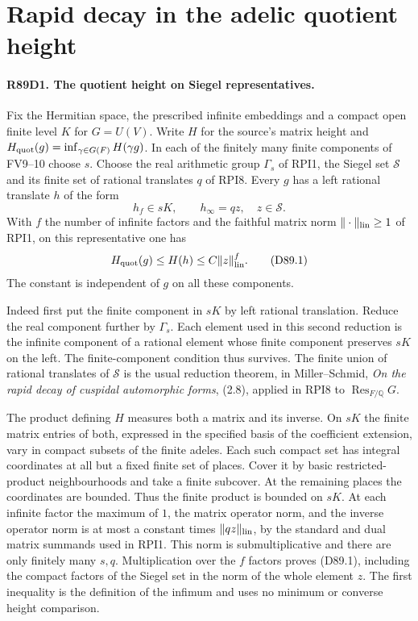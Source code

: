 \section{Rapid decay in the adelic quotient height}

\paragraph{R89D1. The quotient height on Siegel representatives.}
Fix the Hermitian space, the prescribed infinite embeddings and a
compact open finite level $K$ for $G=U(V)$. Write $H$ for the source's
matrix height and $H_{\rm quot}(g)=\inf_{\gamma\in G(F)}H(\gamma g)$.
In each of the finitely many finite components of FV9--10 choose $s$.
Choose the real arithmetic group $\Gamma_s$ of RPI1, the Siegel set
$\mathcal S$ and its finite set of rational translates $q$ of RPI8.
Every $g$ has a left rational translate $h$ of the form
\[
               h_f\in sK,\qquad h_\infty=qz,\quad z\in\mathcal S.
\]
With $f$ the number of infinite factors and the faithful matrix norm
$\|\cdot\|_{\rm lin}\ge1$ of RPI1, on this representative one has
\[
             H_{\rm quot}(g)\le H(h)\le C\|z\|_{\rm lin}^{f}.
                                                               \tag{D89.1}
\]
The constant is independent of $g$ on all these components.

Indeed first put the finite component in $sK$ by left rational
translation. Reduce the real component further by $\Gamma_s$.
Each element used in this second reduction is the infinite component
of a rational element whose finite component preserves $sK$ on the
left. The finite-component condition thus survives. The finite union
of rational translates of $\mathcal S$ is the usual reduction theorem,
in Miller--Schmid, \emph{On the rapid decay of cuspidal automorphic
forms}, (2.8), applied in RPI8 to $\operatorname{Res}_{F/\mathbb Q}G$.

The product defining $H$ measures both a matrix and its inverse. On
$sK$ the finite matrix entries of both, expressed in the specified
basis of the coefficient extension, vary in compact subsets of the
finite adeles. Each such compact set has integral coordinates at all
but a fixed finite set of places. Cover it by basic restricted-product
neighbourhoods and take a finite subcover. At the remaining places
the coordinates are bounded. Thus the finite product is bounded on
$sK$. At each infinite factor the maximum of $1$, the matrix
operator norm, and the inverse operator norm is at most a constant
times $\|qz\|_{\rm lin}$, by the standard and dual matrix
summands used in RPI1. This norm is submultiplicative and there are
only finitely many $s,q$. Multiplication over the $f$ factors proves
(D89.1), including the compact factors of the Siegel set in the norm
of the whole element $z$. The first inequality is the definition of
the infimum and uses no minimum or converse height comparison.

